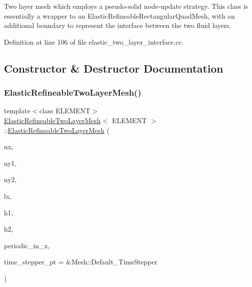 Two layer mesh which employs a pseudo-\/solid node-\/update strategy. This class is essentially a wrapper to an Elastic\+Refineable\+Rectangular\+Quad\+Mesh, with an additional boundary to represent the interface between the two fluid layers. 

Definition at line 106 of file elastic\+\_\+two\+\_\+layer\+\_\+interface.\+cc.



\subsection{Constructor \& Destructor Documentation}
\mbox{\label{classElasticRefineableTwoLayerMesh_a4f6c6b4214a7a99e94e24906d033f8f7}} 
\subsubsection{\texorpdfstring{Elastic\+Refineable\+Two\+Layer\+Mesh()}{ElasticRefineableTwoLayerMesh()}}
{\footnotesize\ttfamily template$<$class E\+L\+E\+M\+E\+NT$>$ \\
\hyperlink{classElasticRefineableTwoLayerMesh}{Elastic\+Refineable\+Two\+Layer\+Mesh}$<$ E\+L\+E\+M\+E\+NT $>$\+::\hyperlink{classElasticRefineableTwoLayerMesh}{Elastic\+Refineable\+Two\+Layer\+Mesh} (\begin{DoxyParamCaption}\item[{const unsigned \&}]{nx,  }\item[{const unsigned \&}]{ny1,  }\item[{const unsigned \&}]{ny2,  }\item[{const double \&}]{lx,  }\item[{const double \&}]{h1,  }\item[{const double \&}]{h2,  }\item[{const bool \&}]{periodic\+\_\+in\+\_\+x,  }\item[{Time\+Stepper $\ast$}]{time\+\_\+stepper\+\_\+pt = {\ttfamily \&Mesh\+:\+:Default\+\_\+TimeStepper} }\end{DoxyParamCaption})\hspace{0.3cm}{\ttfamily [inline]}}



